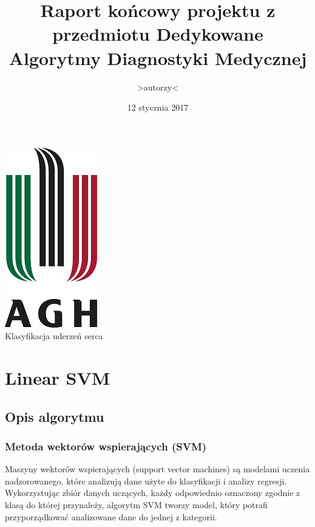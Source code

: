 \documentclass[[10pt,a4paper]{article}
\begin{document}
\title{Raport końcowy projektu z przedmiotu Dedykowane Algorytmy Diagnostyki Medycznej}
\author{>autorzy<}
\date{12 stycznia 2017}
\maketitle


\begin{center}
\includegraphics{logo_agh}\\
\vspace{20mm}
{\LARGE Klasyfikacja uderzeń serca}\\

\end{center}

\newpage
\tableofcontents
\vspace{10mm}
\newpage
\section{Linear SVM}
\subsection{Opis algorytmu}
\vspace{5mm}
\subsubsection{Metoda wektorów wspierających (SVM)}
\vspace{5mm}


Maszyny wektorów wspierających (support vector machines) są modelami uczenia nadzorowanego, które analizują dane użyte do klasyfikacji i analizy regresji.
 Wykorzystując zbiór danych uczących, każdy odpowiednio oznaczony zgodnie z klasą do której przynależy, algorytm SVM tworzy model, który potrafi
przyporządkować analizowane dane do jednej z kategorii. 
\vspace{5mm}
\end{document}
